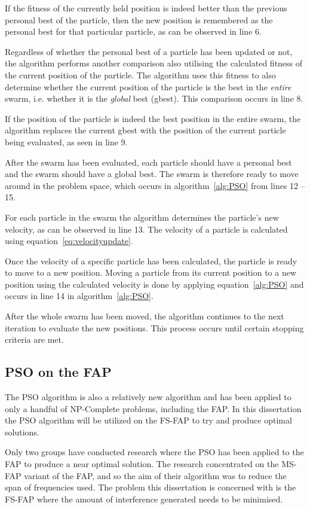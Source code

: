 If the fitness of the currently held position is indeed better than the previous personal best of the particle, then the new position is remembered as the personal best for that particular particle, as can be observed in line 6.

Regardless of whether the personal best of a particle has been updated or not, the algorithm performs another comparison also utilising the calculated fitness of the current position of the particle. The algorithm uses this fitness to also determine whether the current position of the particle is the best in the \emph{entire} swarm, i.e. whether it is  the \emph{global} best (gbest). This comparison occurs in line  8.

If the position of the particle is indeed the best position in the entire swarm, the algorithm replaces the current gbest with the position of the current particle being evaluated, as seen in line 9.

After the swarm has been evaluated, each particle should have a personal best and the swarm should have a global best. The swarm is therefore ready to move around in the problem space, which occurs in algorithm~\ref{alg:PSO} from lines 12 -- 15.

For each particle in the swarm the algorithm determines the particle's new velocity, as can be observed in line 13. The velocity of a particle is calculated using equation~\ref{eq:velocityupdate}. 

Once the velocity of a specific particle has been calculated, the particle is ready to move to a new position. Moving a particle from its current position to a new position using the calculated velocity is done by applying equation~\ref{alg:PSO} and occurs in line 14 in algorithm~\ref{alg:PSO}.

After the whole swarm has been moved, the algorithm continues to the next iteration to evaluate the new positions. This process occurs until certain stopping criteria are met.


\subsection{PSO on the \gls{FAP}}
\label{sec:psoonfap}
The \gls{PSO} algorithm is also a relatively new algorithm and has been applied to only a handful of NP-Complete problems, including the \gls{FAP}. In this dissertation the \gls{PSO} algorithm will be utilized on the \gls{FS-FAP} to try and produce optimal solutions. 

Only two groups have conducted research where the \gls{PSO} has been applied to the \gls{FAP} to produce a near optimal solution. The research concentrated on the \gls{MS-FAP} variant of the \gls{FAP}, and so the aim of their algorithm was to reduce the span of frequencies used. The problem this dissertation is concerned with is the \gls{FS-FAP} where the amount of interference generated needs to be minimised. 

